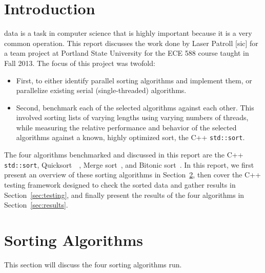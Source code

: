 \documentclass[journal]{IEEEtran}
\begin{document}
\section{Introduction}
% 
% 
% 
% 
 data is a task in computer science that is highly important because it is a very common operation. This report discusses the work done by Laser Patroll [sic] for a team project at Portland State University for the ECE 588 course taught in Fall 2013. The focus of this project was twofold: 
\begin{itemize}
\item First, to either identify parallel sorting algorithms and implement them, or parallelize existing serial (single-threaded) algorithms. 
\item Second, benchmark each of the selected algorithms against each other.  This involved sorting lists of varying lengths using varying numbers of threads, while measuring the relative performance and behavior of the selected algorithms against a known, highly optimized sort, the C++ \texttt{std::sort}.
\end{itemize}

The four algorithms benchmarked and discussed in this report are the C++ \texttt{std::sort}, Quicksort~\cite{Hoare1961}~\cite{Hoare1962}, Merge sort~\cite{Knuth:1998:ACP:280635}, and Bitonic sort~\cite{Batcher1968}. In this report, we first present an overview of these sorting algorithms in Section~\ref{sec:sorting}, then cover the C++ testing framework designed to check the sorted data and gather results in Section~\ref{sec:testing}, and finally present the results of the four algorithms in Section~\ref{sec:results}.

\section{Sorting Algorithms}
\label{sec:sorting}
This section will discuss the four sorting algorithms run.
\end{document}
